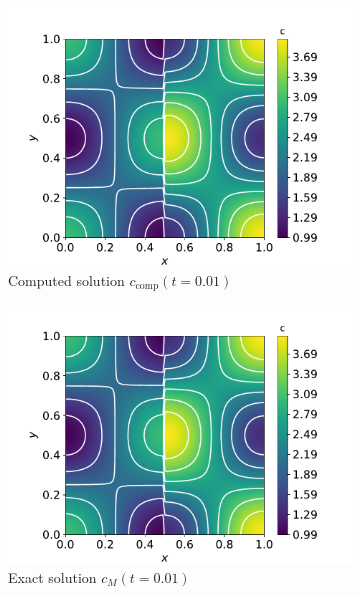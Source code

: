 \begin{figure}
    \centering
    \begin{subfigure}{0.33\linewidth}
        \centering
        \includegraphics[width=\linewidth]{Figures/Chapter3/monoblocks/interface_condition/u_computed_t0.01.pdf}
        \caption{Computed solution $c_\mathrm{comp}(t=0.01)$}
    \end{subfigure}%
    \begin{subfigure}{0.33\linewidth}
        \centering
        \includegraphics[width=\linewidth]{Figures/Chapter3/monoblocks/interface_condition/u_exact_t0.01.pdf}
        \caption{Exact solution $c_M(t=0.01)$}
    \end{subfigure}%
    \begin{subfigure}{0.33\linewidth}

\end{subfigure}
\end{figure}
